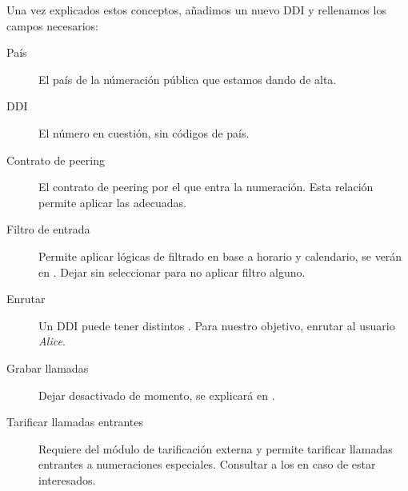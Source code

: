 \documentclass[letterpaper,10pt,spanish]{sphinxmanual}
\begin{document}
Una vez explicados estos conceptos, añadimos un nuevo DDI y rellenamos los campos necesarios:

\label{external_incoming_calls/configure_ddi:bill-inbound}\begin{description}
\item[{País}] \leavevmode{}\label{external_incoming_calls/configure_ddi:term-country}
El país de la númeración pública que estamos dando de alta.

\item[{DDI}] \leavevmode{}\label{external_incoming_calls/configure_ddi:term-ddi}
El número en cuestión, sin códigos de país.

\item[{Contrato de peering}] \leavevmode{}\label{external_incoming_calls/configure_ddi:term-peering-contract}
El contrato de peering por el que entra la numeración. Esta relación permite aplicar las {\hyperref[external_incoming_calls/numeric_transformations:numeric\string-transformations]{}} adecuadas.

\item[{Filtro de entrada}] \leavevmode{}\label{external_incoming_calls/configure_ddi:term-external-call-filter}
Permite aplicar lógicas de filtrado en base a horario y calendario, se verán en {\hyperref[pbx_features/external_filters:external\string-filters]{}}. Dejar sin seleccionar para no aplicar filtro alguno.

\item[{Enrutar}] \leavevmode{}\label{external_incoming_calls/configure_ddi:term-route}
Un DDI puede tener distintos {\hyperref[pbx_features/external_ddis:routing\string-logics]{}}. Para nuestro objetivo, enrutar al usuario \emph{Alice}.

\item[{Grabar llamadas}] \leavevmode{}\label{external_incoming_calls/configure_ddi:term-record-calls}
Dejar desactivado de momento, se explicará en {\hyperref[pbx_features/call_recording:call\string-recordings]{}}.

\item[{Tarificar llamadas entrantes}] \leavevmode{}\label{external_incoming_calls/configure_ddi:term-tarificate-incoming-calls}
Requiere del módulo de tarificación externa y permite tarificar llamadas entrantes a numeraciones especiales. Consultar a los {\hyperref[intro/getting_help:getting\string-help]{}} en caso de estar interesados.

\end{description}
\end{document}
